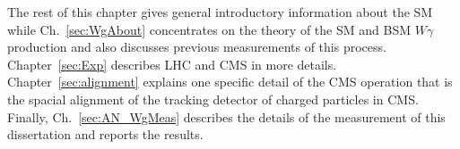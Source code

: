 The rest of this chapter gives general introductory information about the SM while Ch.~\ref{sec:WgAbout} concentrates on the theory of the SM and BSM $W\gamma$ production and also discusses previous measurements of this process. Chapter~\ref{sec:Exp} describes LHC and CMS in more details. Chapter~\ref{sec:alignment} explains one specific detail of the CMS operation that is the spacial alignment of the tracking detector of charged particles in CMS. Finally, Ch.~\ref{sec:AN_WgMeas} describes the details of the measurement of this dissertation and reports the results.\\ 

%
%
%
%
%
%
